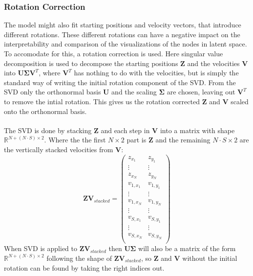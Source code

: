 \subsubsection{Rotation Correction}
\label{sec:Method:ProposedModel:RotationCorrection}
The model might also fit starting positions and velocity vectors, that introduce different rotations. These different rotations can have a negative impact on the interpretability and comparison of the visualizations of the nodes in latent space. To accomodate for this, a rotation correction is used. Here singular value decomposition is used to decompose the starting positions $\textbf{Z}$ and the velocities $\textbf{V}$ into $\textbf{U} \boldsymbol{\Sigma} \textbf{V}^{T}$, where $\textbf{V}^T$ has nothing to do with the velocities, but is simply the standard way of writing the initial rotation component of the SVD. 
From the SVD only the orthonormal basis $\textbf{U}$ and the scaling $\boldsymbol{\Sigma}$ are chosen, leaving out $\textbf{V}^{T}$ to remove the intial rotation. This gives us the rotation corrected $\textbf{Z}$ and $\textbf{V}$ scaled onto the orthonormal basis.
\\\\
The SVD is done by stacking $\textbf{Z}$ and each step in $\textbf{V}$ into a matrix with shape $\mathbb{R}^{N+(N \cdot S) \times 2}$. Where the the first $N \times 2$ part is $\textbf{Z}$ and the remaining $N\cdot S \times 2$ are the vertically stacked velocities from $\textbf{V}$:
\begin{equation}
    \textbf{ZV}_{stacked} = 
    \begin{pmatrix}
       z_{x_1} & z_{y_1} \\
       \vdots & \vdots  \\
       z_{x_N} & z_{y_N} \\
       v_{1, x_1} & v_{1,y_1} \\
       \vdots & \vdots  \\
       v_{1,x_N} & v_{1,y_N} \\
       \vdots & \vdots  \\
       v_{S, x_1} & v_{S,y_1} \\
       \vdots & \vdots  \\
       v_{S,x_N} & v_{S,y_N} \\
    \end{pmatrix}
\end{equation}
\noindent
When SVD is applied to $\textbf{ZV}_{stacked}$ then $\textbf{U}\boldsymbol{\Sigma}$ will also be a matrix of the form $\mathbb{R}^{N+(N \cdot S) \times 2}$ following the shape of $\textbf{ZV}_{stacked}$, so $\textbf{Z}$ and $\textbf{V}$ without the initial rotation can be found by taking the right indices out.
